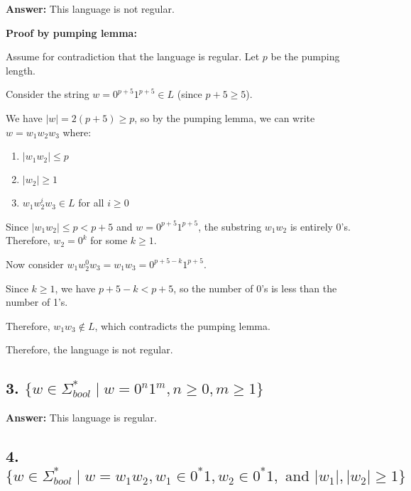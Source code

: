 \documentclass[12pt]{article}
\begin{document}
\textbf{Answer:} This language is not regular.

\textbf{Proof by pumping lemma:}

Assume for contradiction that the language is regular. Let $p$ be the pumping length.

Consider the string $w = 0^{p+5}1^{p+5} \in L$ (since $p+5 \geq 5$).

We have $|w| = 2(p+5) \geq p$, so by the pumping lemma, we can write $w = w_1w_2w_3$ where:
\begin{enumerate}
    \item $|w_1w_2| \leq p$
    \item $|w_2| \geq 1$
    \item $w_1w_2^iw_3 \in L$ for all $i \geq 0$
\end{enumerate}

Since $|w_1w_2| \leq p < p+5$ and $w = 0^{p+5}1^{p+5}$, the substring $w_1w_2$ is entirely 0's. Therefore, $w_2 = 0^k$ for some $k \geq 1$.

Now consider $w_1w_2^0w_3 = w_1w_3 = 0^{p+5-k}1^{p+5}$.

Since $k \geq 1$, we have $p+5-k < p+5$, so the number of 0's is less than the number of 1's.

Therefore, $w_1w_3 \notin L$, which contradicts the pumping lemma.

Therefore, the language is not regular.

\subsection*{3. $\{w \in \Sigma^*_{bool} \mid w = 0^n1^m, n \geq 0, m \geq 1\}$}

\textbf{Answer:} This language is regular.

\begin{center}
\end{center}

\subsection*{4. $\{w \in \Sigma^*_{bool} \mid w = w_1w_2, w_1 \in 0^*1, w_2 \in 0^*1, \text{ and } |w_1|, |w_2| \geq 1\}$}
\end{document}
